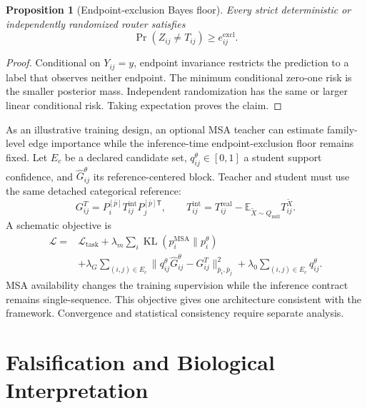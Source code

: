 \documentclass[10pt]{article}
\newcommand{\E}{\mathbb E}
\newtheorem{proposition}[theorem]{Proposition}
\theoremstyle{definition}
\theoremstyle{remark}
\newcommand{\BookChapter}[1]{\section{#1}}
\newcommand{\BookInsert}[1]{}
\newcommand{\BookChapterLabel}[1]{}
\begin{document}
\begin{proposition}[Endpoint-exclusion Bayes floor]
\label{prop:cavity-bayes-floor}
Every strict deterministic or independently randomized router satisfies
\begin{equation}
\Pr(Z_{ij}\ne T_{ij})\geq e_{ij}^{\mathrm{excl}}.
\end{equation}
\end{proposition}

\begin{proof}
Conditional on $Y_{ij}=y$, endpoint invariance restricts the prediction to a label that observes
neither endpoint.  The minimum conditional zero-one risk is the smaller posterior mass.
Independent randomization has the same or larger linear conditional risk.  Taking expectation
proves the claim.
\end{proof}

\BookInsert{chapters/11_cavity_tradeoff_example}

As an illustrative training design, an optional MSA teacher can estimate family-level edge
importance while the inference-time endpoint-exclusion floor remains fixed.  Let $E_c$ be a declared candidate set,
$q_{ij}^{\theta}\in[0,1]$ a student support confidence, and $\widehat G_{ij}^{\theta}$ its
reference-centered block.  Teacher and student must use the same detached categorical reference:
\begin{equation}
G_{ij}^{T}=P_i^{[\bar p]}T_{ij}^{\mathrm{int}}P_j^{[\bar p]\mathsf T},
\qquad
T_{ij}^{\mathrm{int}}
=T_{ij}^{\mathrm{real}}-\E_{\widetilde X\sim Q_{\mathrm{null}}}T_{ij}^{\widetilde X}.
\label{eq:optional-msa-teacher}
\end{equation}
A schematic objective is
\begin{align}
\mathcal L={}&\mathcal L_{\mathrm{task}}
+\lambda_m\sum_i\operatorname{KL}(p_i^{\mathrm{MSA}}\|p_i^\theta)\nonumber\\
&+\lambda_G\sum_{(i,j)\in E_c}
\|q_{ij}^\theta\widehat G_{ij}^\theta-G_{ij}^{T}\|_{\bar p_i,\bar p_j}^2
+\lambda_0\sum_{(i,j)\in E_c}q_{ij}^\theta.
\label{eq:training-objective}
\end{align}
MSA availability changes the training supervision while the inference contract remains
single-sequence.  This objective gives one architecture consistent with the framework.  Convergence
and statistical consistency require separate analysis.

\BookInsert{chapters/10_coda}
\BookChapter{Falsification and Biological Interpretation}
\BookChapterLabel{chap:book-falsification}
\BookInsert{chapters/11_opening}
\BookInsert{chapters/14_epistasis_primer}
\BookInsert{chapters/12_vertical_audit}
\end{document}
